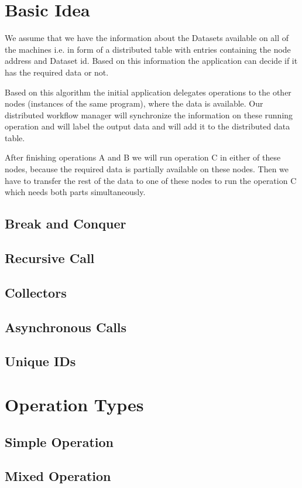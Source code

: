 \section{Basic Idea}
We assume that we have the information about the Datasets
available on all of the machines i.e. in form of a distributed table
with entries containing the node address and Dataset id. Based on this
information the application can decide if it has the required data or
not. 

Based on this algorithm the initial application delegates operations to the other 
nodes (instances of the same program), where the data is available. 
Our distributed workflow manager will synchronize the information on these running operation and
will label the output data and will add it to the distributed data table.

After finishing operations A and B we will run operation C in either
of these nodes, because the required data is partially available on these
nodes. Then we have to transfer the rest of the data to one of these
nodes to run the operation C which needs both parts simultaneously.

\subsection{Break and Conquer}
\subsection{Recursive Call}
\subsection{Collectors}
\subsection{Asynchronous Calls}
\subsection{Unique IDs}


\section{Operation Types}
\subsection{Simple Operation}
\subsection{Mixed Operation}

